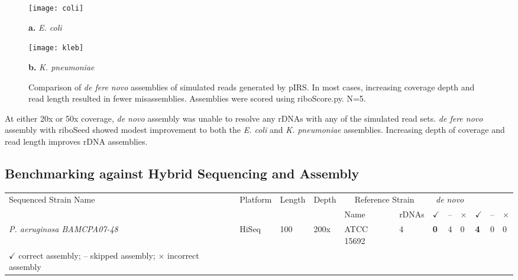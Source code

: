 \documentclass[a4,center,fleqn]{NAR}
\begin{document}
\begin{figure}[!ht]
  \centering
  \begin{minipage}{.45\textwidth}
    \centering
    \texttt{[image: coli]}

    {\footnotesize \textbf{a.} \textit{E. coli}}
    \label{fig:sim_coli}
  \end{minipage}

  \begin{minipage}{.45\textwidth}
    \centering
    \texttt{[image: kleb]}

    {\footnotesize \textbf{b.} \textit{K. pneumoniae}}
    \label{fig:sim_kleb}
  \end{minipage}%
  \caption{Comparison of \textit{de fere novo} assemblies of simulated reads generated by pIRS. In most cases, increasing coverage depth and read length resulted in fewer misassemblies. Assemblies were scored using riboScore.py. N=5.}
  \label{fig:simreads}
\end{figure}

At either 20x or 50x coverage, \textit{de novo} assembly was unable to resolve any rDNAs with any of the simulated read sets. \textit{de fere novo} assembly with riboSeed showed modest improvement to both the \textit{E. coli} and \textit{K. pneumoniae} assemblies. Increasing depth of coverage and read length improves rDNA assemblies.

\subsection*{Benchmarking against Hybrid Sequencing and Assembly}
\begin{table*}[!hb]
  \centering

  \caption{Assembly of Hybrid-Sequenced \textit{P. aeruginosa BAMCPA07-48}}
  \label{table:paohybrid}
  \begin{tabular}{p{4.9cm}p{.95cm}p{.75cm}p{.75cm}p{2.0cm}p{.6cm}>{\hfill}p{.3cm}p{.2cm}p{.2cm}p{.3cm}p{.2cm}p{.2cm}}
    \toprule
    \multirow{2}{*}{Sequenced Strain Name} & \multirow{2}{*}{Platform}  & \multirow{2}{*}{Length} & \multirow{2}{*}{Depth}  &  \multicolumn{2}{c}{Reference Strain} &  \multicolumn{3}{c}{\textit{de novo}} & \multicolumn{3}{c}{\textit{de fere novo}} \\
                            &   &   &   & Name & rDNAs  &  \textbf{$\checkmark$} & -- & $\times$ &  \textbf{$\checkmark$} & -- & $\times$  \\
    \colrule
    \textit{P. aeruginosa BAMCPA07-48} & HiSeq & 100 & 200x & ATCC 15692  & 4 & \textbf{0} & 4 & 0 & \textbf{4} & 0 & 0 \\
    \botrule
    \begin{minipage}[t]{.5\textwidth}
      {\tiny
        $\checkmark$ correct assembly; -- skipped assembly; $\times$ incorrect assembly
      }
    \end{minipage}
  \end{tabular}
\end{table*}
\end{document}
